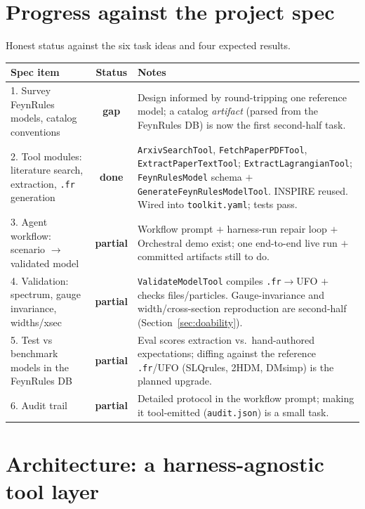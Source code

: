 \documentclass[11pt]{article}
\newcommand{\code}[1]{\texttt{#1}}
\newcommand{\done}{\textcolor{okgreen}{\textbf{done}}}
\newcommand{\partialx}{\textcolor{warn}{\textbf{partial}}}
\newcommand{\gapx}{\textcolor{gap}{\textbf{gap}}}
\newcommand{\arw}{$\rightarrow$}
\begin{document}
\section{Progress against the project spec}
\label{sec:progress}

Honest status against the six task ideas and four expected results.

\begin{center}
\renewcommand{\arraystretch}{1.25}
\begin{tabularx}{\textwidth}{@{}p{5.2cm}cX@{}}
\toprule
\textbf{Spec item} & \textbf{Status} & \textbf{Notes} \\
\midrule
1. Survey FeynRules models, catalog conventions & \gapx & Design informed by round-tripping one reference model; a catalog \emph{artifact} (parsed from the FeynRules DB) is now the first second-half task. \\
2. Tool modules: literature search, extraction, \code{.fr} generation & \done & \code{ArxivSearchTool}, \code{FetchPaperPDFTool}, \code{ExtractPaperTextTool}; \code{ExtractLagrangianTool}; \code{FeynRulesModel} schema $+$ \code{GenerateFeynRulesModelTool}. INSPIRE reused. Wired into \code{toolkit.yaml}; tests pass. \\
3. Agent workflow: scenario \arw{} validated model & \partialx & Workflow prompt $+$ harness-run repair loop $+$ Orchestral demo exist; one end-to-end live run $+$ committed artifacts still to do. \\
4. Validation: spectrum, gauge invariance, widths/xsec & \partialx & \code{ValidateModelTool} compiles \code{.fr}\arw{}UFO $+$ checks files/particles. Gauge-invariance and width/cross-section reproduction are second-half (Section~\ref{sec:doability}). \\
5. Test vs benchmark models in the FeynRules DB & \partialx & Eval scores extraction vs.\ hand-authored expectations; diffing against the reference \code{.fr}/UFO (SLQrules, 2HDM, DMsimp) is the planned upgrade. \\
6. Audit trail & \partialx & Detailed protocol in the workflow prompt; making it tool-emitted (\code{audit.json}) is a small task. \\
\bottomrule
\end{tabularx}
\end{center}

\section{Architecture: a harness-agnostic tool layer}
\label{sec:arch}
\end{document}
